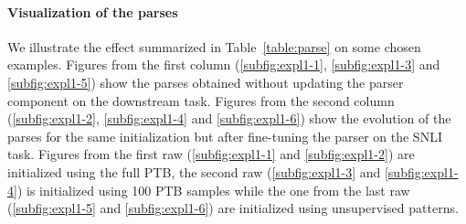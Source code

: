 \paragraph{Visualization of the parses} We illustrate the effect summarized in Table~\ref{table:parse} on some chosen examples. Figures from the first column (\ref{subfig:expl1-1}, \ref{subfig:expl1-3} and \ref{subfig:expl1-5}) show the parses obtained without updating the parser component on the downstream task. Figures from the second column (\ref{subfig:expl1-2}, \ref{subfig:expl1-4} and \ref{subfig:expl1-6}) show the evolution of the parses for the same initialization but after fine-tuning the parser on the SNLI task. Figures from the first raw (\ref{subfig:expl1-1} and \ref{subfig:expl1-2}) are initialized using the full PTB, the second raw (\ref{subfig:expl1-3} and \ref{subfig:expl1-4}) is initialized using 100 PTB samples while the one from the last raw (\ref{subfig:expl1-5} and \ref{subfig:expl1-6}) are initialized using unsupervised patterns.

